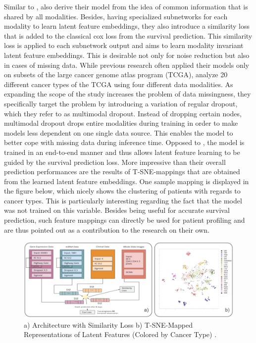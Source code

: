 \documentclass[
]{krantz}
\begin{document}
Similar to \citet{TongAE}, \citet{Cheerla2019} also derive their model from the idea of common information that is shared by all modalities. Besides, having specialized subnetworks for each modality to learn latent feature embeddings, they also introduce a similarity loss that is added to the classical cox loss from the survival prediction. This similarity loss is applied to each subnetwork output and aims to learn modality invariant latent feature embeddings. This is desirable not only for noise reduction but also in cases of missing data. While previous research often applied their models only on subsets of the large cancer genome atlas program (TCGA), \citet{Cheerla2019} analyze 20 different cancer types of the TCGA using four different data modalities. As expanding the scope of the study increases the problem of data missingness, they specifically target the problem by introducing a variation of regular dropout, which they refer to as multimodal dropout. Instead of dropping certain nodes, multimodal dropout drops entire modalities during training in order to make models less dependent on one single data source. This enables the model to better cope with missing data during inference time. Opposed to \citet{TongAE}, the model is trained in an end-to-end manner and thus allows latent feature learning to be guided by the survival prediction loss. More impressive than their overall prediction performances are the results of T-SNE-mappings that are obtained from the learned latent feature embeddings. One sample mapping is displayed in the figure below, which nicely shows the clustering of patients with regards to cancer types. This is particularly interesting regarding the fact that the model was not trained on this variable. Besides being useful for accurate survival prediction, such feature mappings can directly be used for patient profiling and are thus pointed out as a contribution to the research on their own.

\begin{figure}

{\centering \includegraphics[width=1\linewidth]{figures/03-02-struc+unstruc-data/Cheerla2019model} 

}

\caption{a) Architecture with Similarity Loss b) T-SNE-Mapped Representations of Latent Features (Colored by Cancer Type) \citep{Cheerla2019}.}\label{fig:cheerla-model}
\end{figure}
\end{document}
